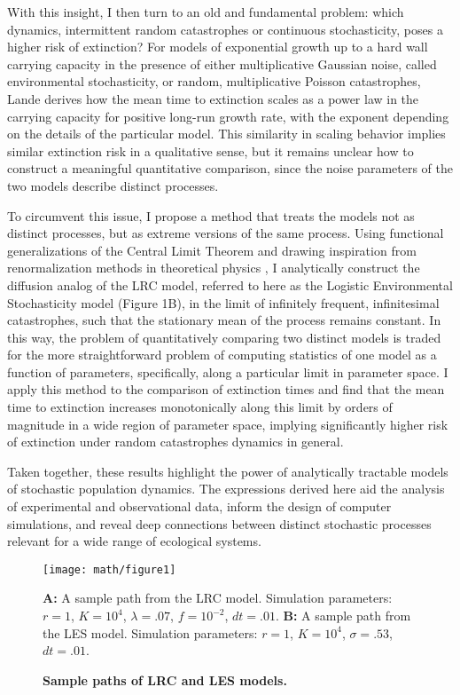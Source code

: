 With this insight, I then turn to an old and fundamental problem: which dynamics, intermittent random catastrophes or continuous stochasticity, poses a higher risk of extinction?  For models of exponential growth up to a hard wall carrying capacity in the presence of either multiplicative Gaussian noise, called environmental stochasticity, or random, multiplicative Poisson catastrophes, Lande \cite{lande1993risks}  derives how the mean time to extinction scales as a power law in the carrying capacity for positive long-run growth rate, with the exponent depending on the details of the particular model.  This similarity in scaling behavior implies similar extinction risk in a qualitative sense, but it remains unclear how to construct a meaningful quantitative comparison, since the noise parameters of the two models describe distinct processes.  

To circumvent this issue, I propose a method that treats the models not as distinct processes, but as extreme versions of the same process.  Using functional generalizations of the Central Limit Theorem \cite{jacod2013limit} and drawing inspiration from renormalization methods in theoretical physics \cite{peskin1995quantum,jona1975renormalization}, I analytically construct the diffusion analog of the LRC model, referred to here as the Logistic Environmental Stochasticity model (Figure 1B), in the limit of infinitely frequent, infinitesimal catastrophes, such that the stationary mean of the process remains constant.  In this way, the problem of quantitatively comparing two distinct models is traded for the more straightforward problem of computing statistics of one model as a function of parameters, specifically, along a particular limit in parameter space.  I apply this method to the comparison of extinction times and find that the mean time to extinction increases monotonically along this limit by orders of magnitude in a wide region of parameter space, implying significantly higher risk of extinction under random catastrophes dynamics in general.

Taken together, these results highlight the power of analytically tractable models of stochastic population dynamics.  The expressions derived here aid the analysis of experimental and observational data, inform the design of computer simulations, and reveal deep connections between distinct stochastic processes relevant for a wide range of ecological systems.

\begin{figure}
	\centerline{
		\texttt{[image: math/figure1]}}
	\caption{\textbf{Sample paths of LRC and LES models.}}  {\textbf{A:}  A sample path from the LRC model.  Simulation parameters:  $r = 1$, $K = 10^4$, $\lambda = .07$, $f = 10^{-2}$, $dt = .01$.   \textbf{B:}   A sample path from the LES model.  Simulation parameters:  $r = 1$, $K = 10^4$, $\sigma = .53$, $dt = .01$.      }
\end{figure}

